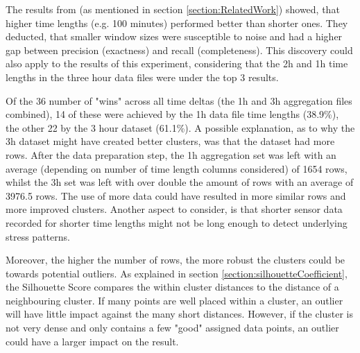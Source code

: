 The results from \textcite{AboutToEat2016Rahman} (as mentioned in section \ref{section:RelatedWork}) showed, that higher time lengths (e.g. 100 minutes) performed better than shorter ones. They deducted, that smaller window sizes were susceptible to noise and had a higher gap between precision (exactness) and recall (completeness). 
This discovery could also apply to the results of this experiment, considering that the 2h and 1h time lengths in the three hour data files were under the top 3 results.


Of the 36 number of "wins" across all time deltas (the 1h and 3h aggregation files combined), 14 of these were achieved by the 1h data file time lengths (38.9\%), the other 22 by the 3 hour dataset (61.1\%). A possible explanation, as to why the 3h dataset might have created better clusters, was that the dataset had more rows. After the data preparation step, the 1h aggregation set was left with an average (depending on number of time length columns considered) of 1654 rows, whilst the 3h set was left with over double the amount of rows with an average of 3976.5 rows. The use of more data could have resulted in more similar rows and more improved clusters. Another aspect to consider, is that shorter sensor data recorded for shorter time lengths might not be long enough to detect underlying stress patterns.

Moreover, the higher the number of rows, the more robust the clusters could be towards potential outliers. As explained in section \ref{section:silhouetteCoefficient}, the Silhouette Score compares the within cluster distances to the distance of a neighbouring cluster. If many points are well placed within a cluster, an outlier will have little impact against the many short distances. However, if the cluster is not very dense and only contains a few "good" assigned data points, an outlier could have a larger impact on the result.








